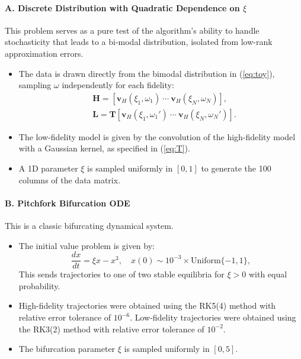 \documentclass[preprint,10pt]{elsarticle}
\begin{document}
\paragraph{A. Discrete Distribution with Quadratic Dependence on $\xi$}
This problem serves as a pure test of the algorithm's ability to handle stochasticity that leads to a bi-modal distribution, isolated from low-rank approximation errors.
\begin{itemize}
    \item The data is drawn directly from the bimodal distribution in (\ref{eq:toy}), sampling $\omega$ independently for each fidelity:
    \begin{align}
        & \bm H = \left[ \bm v_H(\xi_1, \omega_1) \ \cdots \ \bm v_H(\xi_{N}, \omega_{N}) \right], \\
        & \bm L = \bm T \left[ \bm v_H(\xi_1, \omega_1') \ \cdots \ \bm v_H(\xi_{N}, \omega_{N}') \right].
    \end{align}
    \item The low-fidelity model is given by the convolution of the high-fidelity model with a Gaussian kernel, as specified in (\ref{eq:T}).
    \item A 1D parameter $\xi$ is sampled uniformly in $[0,1]$ to generate the 100 columns of the data matrix.
\end{itemize}

\paragraph{B. Pitchfork Bifurcation ODE}
This is a classic bifurcating dynamical system.
\begin{itemize}
    \item The initial value problem is given by:
    \begin{equation}
        \frac{dx}{dt} = \xi x - x^3, \quad x(0) \sim 10^{-3} \times \textrm{Uniform}\{-1, 1\},
    \end{equation}
    This sends trajectories to one of two stable equilibria for $\xi > 0$ with equal probability.
    \item High-fidelity trajectories were obtained using the RK5(4) method \cite{dormand1980family} with relative error tolerance of $10^{-6}$. Low-fidelity trajectories were obtained using the RK3(2) method with relative error tolerance of $10^{-2}$.
    \item The bifurcation parameter $\xi$ is sampled uniformly in $[0, 5]$.
\end{itemize}
\end{document}
